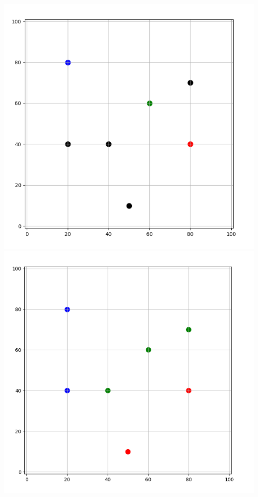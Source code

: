 \documentclass[11pt,class=report,crop=false]{standalone}
\begin{document}
\begin{activite}[Barycentres]
\begin{enumerate}
\begin{enumerate}
		\begin{center}
		\includegraphics[scale=\myscale,scale=0.26]{ecran-barycentres-6a}\qquad
		\includegraphics[scale=\myscale,scale=0.25]{ecran-barycentres-6b}
		\end{center}		
		

\end{enumerate}
\end{enumerate}
\end{activite}
\end{document}
